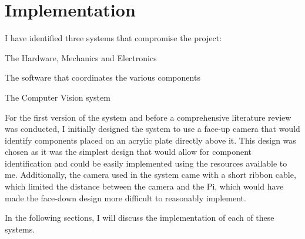 \section{Implementation}
I have identified three systems that compromise the project:
\begin{mylist}
  \item The Hardware, Mechanics and Electronics
  \item The software that coordinates the various components
  \item The Computer Vision system
\end{mylist}

\noindent
For the first version of the system and before a comprehensive literature review was conducted, I initially designed
the system to use a face-up camera that would identify components placed on an acrylic plate directly above it. 
This design was chosen as it was the simplest design that would allow for component identification and could 
be easily implemented using the resources available to me. Additionally, the camera used in the system came with
a short ribbon cable, which limited the distance between the camera and the Pi, which would have made the face-down
design more difficult to reasonably implement.

In the following sections, I will discuss the implementation of each of these systems.

